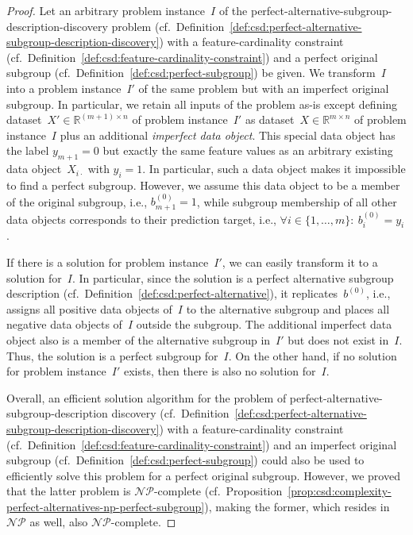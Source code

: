 \documentclass{article}
\theoremstyle{definition}
\begin{document}
\begin{proof}
Let an arbitrary problem instance~$I$ of the perfect-alternative-subgroup-description-discovery problem (cf.~Definition~\ref{def:csd:perfect-alternative-subgroup-description-discovery}) with a feature-cardinality constraint (cf.~Definition~\ref{def:csd:feature-cardinality-constraint}) and a perfect original subgroup (cf.~Definition~\ref{def:csd:perfect-subgroup}) be given.
We transform~$I$ into a problem instance~$I'$ of the same problem but with an imperfect original subgroup.
In particular, we retain all inputs of the problem as-is except defining dataset~$X' \in \mathbb{R}^{(m + 1) \times n}$ of problem instance~$I'$ as dataset~$X \in \mathbb{R}^{m \times n}$ of problem instance~$I$ plus an additional \emph{imperfect data object}.
This special data object has the label $y_{m+1}=0$ but exactly the same feature values as an arbitrary existing data object~$X_{i\cdot}$ with $y_i=1$.
In particular, such a data object makes it impossible to find a perfect subgroup.
However, we assume this data object to be a member of the original subgroup, i.e., $b^{(0)}_{m+1} = 1$, while subgroup membership of all other data objects corresponds to their prediction target, i.e., $\forall i \in \{1, \dots, m\}:~ b^{(0)}_i = y_i$.

If there is a solution for problem instance~$I'$, we can easily transform it to a solution for~$I$.
In particular, since the solution is a perfect alternative subgroup description (cf.~Definition~\ref{def:csd:perfect-alternative}), it replicates~$b^{(0)}$, i.e., assigns all positive data objects of~$I$ to the alternative subgroup and places all negative data objects of~$I$ outside the subgroup.
The additional imperfect data object also is a member of the alternative subgroup in~$I'$ but does not exist in~$I$.
Thus, the solution is a perfect subgroup for~$I$.
On the other hand, if no solution for problem instance~$I'$ exists, then there is also no solution for~$I$.

Overall, an efficient solution algorithm for the problem of perfect-alternative-subgroup-description discovery (cf.~Definition~\ref{def:csd:perfect-alternative-subgroup-description-discovery}) with a feature-cardinality constraint (cf.~Definition~\ref{def:csd:feature-cardinality-constraint}) and an imperfect original subgroup (cf.~Definition~\ref{def:csd:perfect-subgroup}) could also be used to efficiently solve this problem for a perfect original subgroup.
However, we proved that the latter problem is $\mathcal{NP}$-complete (cf.~Proposition~\ref{prop:csd:complexity-perfect-alternatives-np-perfect-subgroup}), making the former, which resides in $\mathcal{NP}$ as well, also $\mathcal{NP}$-complete.
\end{proof}
\end{document}

